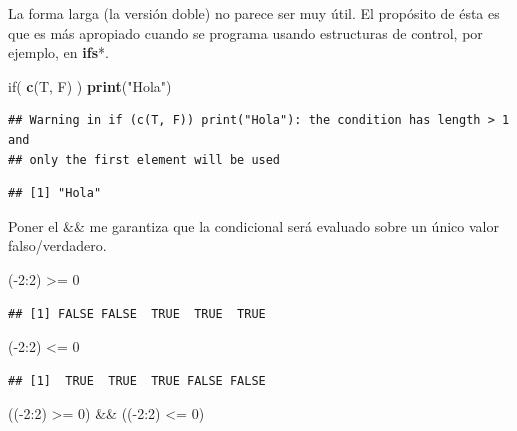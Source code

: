 \documentclass[]{article}
\newenvironment{Shaded}{\begin{snugshade}}{\end{snugshade}}
\newcommand{\KeywordTok}[1]{\textcolor[rgb]{0.13,0.29,0.53}{\textbf{{#1}}}}
\newcommand{\DecValTok}[1]{\textcolor[rgb]{0.00,0.00,0.81}{{#1}}}
\newcommand{\StringTok}[1]{\textcolor[rgb]{0.31,0.60,0.02}{{#1}}}
\newcommand{\NormalTok}[1]{{#1}}
\begin{document}
La forma larga (la versión doble) no parece ser muy útil. El propósito
de ésta es que es más apropiado cuando se programa usando estructuras de
control, por ejemplo, en \textbf{ifs}*.

\begin{Shaded}
\begin{Highlighting}[]
\NormalTok{if( }\KeywordTok{c}\NormalTok{(T, F) ) }\KeywordTok{print}\NormalTok{(}\StringTok{"Hola"}\NormalTok{)}
\end{Highlighting}
\end{Shaded}

\begin{verbatim}
## Warning in if (c(T, F)) print("Hola"): the condition has length > 1 and
## only the first element will be used
\end{verbatim}

\begin{verbatim}
## [1] "Hola"
\end{verbatim}

Poner el \&\& me garantiza que la condicional será evaluado sobre un
único valor falso/verdadero.

\begin{Shaded}
\begin{Highlighting}[]
\NormalTok{(-}\DecValTok{2}\NormalTok{:}\DecValTok{2}\NormalTok{) >=}\StringTok{ }\DecValTok{0} 
\end{Highlighting}
\end{Shaded}

\begin{verbatim}
## [1] FALSE FALSE  TRUE  TRUE  TRUE
\end{verbatim}

\begin{Shaded}
\begin{Highlighting}[]
\NormalTok{(-}\DecValTok{2}\NormalTok{:}\DecValTok{2}\NormalTok{) <=}\StringTok{ }\DecValTok{0}
\end{Highlighting}
\end{Shaded}

\begin{verbatim}
## [1]  TRUE  TRUE  TRUE FALSE FALSE
\end{verbatim}

\begin{Shaded}
\begin{Highlighting}[]
\NormalTok{((-}\DecValTok{2}\NormalTok{:}\DecValTok{2}\NormalTok{) >=}\StringTok{ }\DecValTok{0}\NormalTok{) &&}\StringTok{ }\NormalTok{((-}\DecValTok{2}\NormalTok{:}\DecValTok{2}\NormalTok{) <=}\StringTok{ }\DecValTok{0}\NormalTok{)}
\end{Highlighting}
\end{Shaded}
\end{document}
